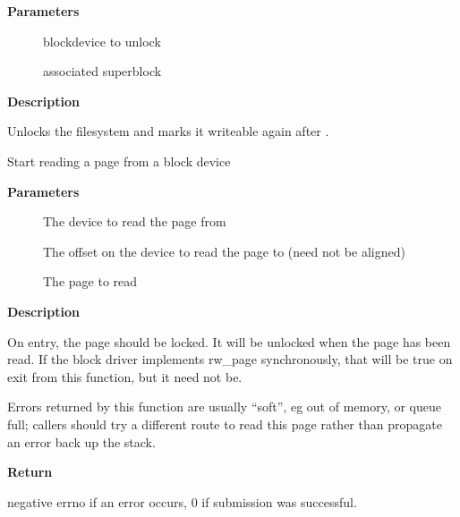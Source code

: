 \documentclass[a4paper,8pt,english]{sphinxmanual}
\begin{document}
\textbf{Parameters}
\begin{description}
\item[{}] \leavevmode
blockdevice to unlock

\item[{}] \leavevmode
associated superblock

\end{description}

\textbf{Description}

Unlocks the filesystem and marks it writeable again after {\hyperref[filesystems/index:c.freeze_bdev]{\emph{}}}.

\begin{fulllineitems}
\label{filesystems/index:c.bdev_read_page}
Start reading a page from a block device

\end{fulllineitems}


\textbf{Parameters}
\begin{description}
\item[{}] \leavevmode
The device to read the page from

\item[{}] \leavevmode
The offset on the device to read the page to (need not be aligned)

\item[{}] \leavevmode
The page to read

\end{description}

\textbf{Description}

On entry, the page should be locked.  It will be unlocked when the page
has been read.  If the block driver implements rw\_page synchronously,
that will be true on exit from this function, but it need not be.

Errors returned by this function are usually ``soft'', eg out of memory, or
queue full; callers should try a different route to read this page rather
than propagate an error back up the stack.

\textbf{Return}

negative errno if an error occurs, 0 if submission was successful.
\end{document}
